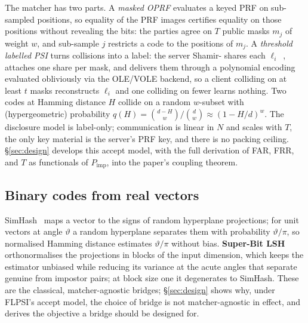 The matcher has two parts. A \emph{masked OPRF} evaluates a keyed PRF on sub-sampled positions, so
equality of the PRF images certifies equality on those positions without revealing the bits: the
parties agree on $T$ public masks $m_j$ of weight $w$, and sub-sample $j$ restricts a code to the
positions of $m_j$. A \emph{threshold labelled PSI} turns collisions into a label: the server Shamir-
shares each $\ell_i$~\cite{Shamir79}, attaches one share per mask, and delivers them through a
polynomial encoding evaluated obliviously via the OLE/VOLE backend, so a client colliding on at least
$t$ masks reconstructs $\ell_i$ and one colliding on fewer learns nothing. Two codes at Hamming
distance $H$ collide on a random $w$-subset with (hypergeometric) probability $q(H) =
\binom{d-H}{w}/\binom{d}{w} \approx (1-H/d)^{w}$. The disclosure model is label-only; communication is
linear in $N$ and scales with $T$, the only key material is the server's PRF key, and there is no
packing ceiling. \S\ref{sec:design} develops this accept model, with the full derivation of FAR, FRR,
and $T$ as functionals of $P_{\mathrm{imp}}$, into the paper's coupling theorem.

\subsection{Binary codes from real vectors}

SimHash~\cite{Charikar02} maps a vector to the signs of random hyperplane projections; for unit
vectors at angle $\vartheta$ a random hyperplane separates them with probability $\vartheta/\pi$, so
normalised Hamming distance estimates $\vartheta/\pi$ without bias. \textbf{Super-Bit
LSH}~\cite{JiEtAl12} orthonormalises the projections in blocks of the input dimension, which keeps the
estimator unbiased while reducing its variance at the acute angles that separate genuine from impostor
pairs; at block size one it degenerates to SimHash. These are the classical, matcher-agnostic bridges;
\S\ref{sec:design} shows why, under FLPSI's accept model, the choice of bridge is not matcher-agnostic
in effect, and derives the objective a bridge should be designed for.
